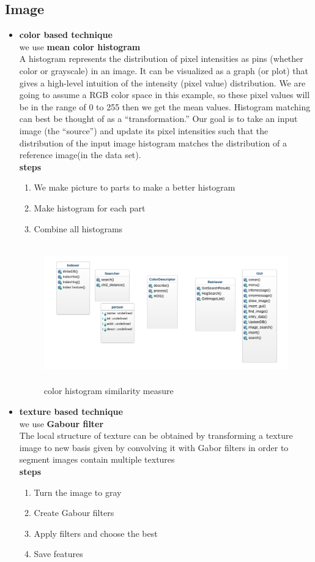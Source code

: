 \documentclass[pdftex,10pt,a4paper,oneside]{article}
\begin{document}
	\subsection{Image}
	\begin{itemize}
		\item \textbf{{\large color based technique}} \\
		we use \textbf{mean color histogram} \\
		A histogram represents the distribution of pixel intensities as pins (whether color or grayscale) in an image. It can be visualized as a graph (or plot) that gives a high-level intuition of the intensity (pixel value) distribution. We are going to assume a RGB color space in this example, so these pixel values will be in the range of 0 to 255 then we get the mean values.
		Histogram matching can best be thought of as a “transformation.” Our goal is to take an input image (the “source”) and update its pixel intensities such that the distribution of the input image histogram matches the distribution of a reference image(in the data set).\\
		\textbf{{\large steps}}\\
		\begin{enumerate}
			\item We make picture to parts to make a better histogram
			\item Make histogram for each part
			\item Combine all histograms 
		\end{enumerate}
		\begin{figure}[H]
		\centering
		\includegraphics[width=120mm,height=60mm]{fig/23.png}
		\caption{color histogram similarity measure }
		\label{color histogram similarity measure}
	\end{figure}
	\item \textbf{{\large texture based technique}} \\
	we use \textbf{Gabour filter} \\
	The local structure of texture can be obtained by transforming a texture image to new basis given by convolving it with Gabor filters in order to segment images contain multiple textures\\
	\textbf{{\large steps}}\\
	\begin{enumerate}
		\item 	Turn the image to gray
		\item Create Gabour filters
		\item	Apply filters and choose the best 
		\item	Save features
		

\end{enumerate}
\end{itemize}
\end{document}
